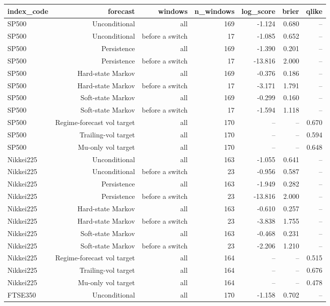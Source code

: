 \begin{tabular}{lrrrrrr}
\toprule
index\_code & forecast & windows & n\_windows & log\_score & brier & qlike \\
\midrule
SP500 & Unconditional & all & 169 & -1.124 & 0.680 & -- \\
SP500 & Unconditional & before a switch & 17 & -1.085 & 0.652 & -- \\
SP500 & Persistence & all & 169 & -1.390 & 0.201 & -- \\
SP500 & Persistence & before a switch & 17 & -13.816 & 2.000 & -- \\
SP500 & Hard-state Markov & all & 169 & -0.376 & 0.186 & -- \\
SP500 & Hard-state Markov & before a switch & 17 & -3.171 & 1.791 & -- \\
SP500 & Soft-state Markov & all & 169 & -0.299 & 0.160 & -- \\
SP500 & Soft-state Markov & before a switch & 17 & -1.594 & 1.118 & -- \\
SP500 & Regime-forecast vol target & all & 170 & -- & -- & 0.670 \\
SP500 & Trailing-vol target & all & 170 & -- & -- & 0.594 \\
SP500 & Mu-only vol target & all & 170 & -- & -- & 0.648 \\
Nikkei225 & Unconditional & all & 163 & -1.055 & 0.641 & -- \\
Nikkei225 & Unconditional & before a switch & 23 & -0.956 & 0.587 & -- \\
Nikkei225 & Persistence & all & 163 & -1.949 & 0.282 & -- \\
Nikkei225 & Persistence & before a switch & 23 & -13.816 & 2.000 & -- \\
Nikkei225 & Hard-state Markov & all & 163 & -0.610 & 0.257 & -- \\
Nikkei225 & Hard-state Markov & before a switch & 23 & -3.838 & 1.755 & -- \\
Nikkei225 & Soft-state Markov & all & 163 & -0.468 & 0.231 & -- \\
Nikkei225 & Soft-state Markov & before a switch & 23 & -2.206 & 1.210 & -- \\
Nikkei225 & Regime-forecast vol target & all & 164 & -- & -- & 0.515 \\
Nikkei225 & Trailing-vol target & all & 164 & -- & -- & 0.676 \\
Nikkei225 & Mu-only vol target & all & 164 & -- & -- & 0.478 \\
FTSE350 & Unconditional & all & 170 & -1.158 & 0.702 & -- \\

\end{tabular}
